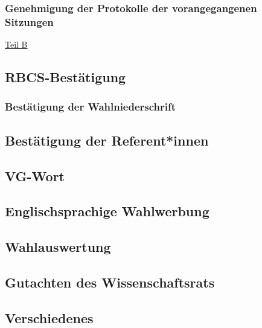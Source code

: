 \documentclass[ngerman,headheight=70pt]{scrartcl}
\begin{document}
    \subsubsection{Genehmigung der Protokolle der vorangegangenen Sitzungen}


    \vspace{0.5cm}
    {\Large \underline{Teil B}}


    \subsection{RBCS-Bestätigung}

    \subsubsection{Bestätigung der Wahlniederschrift}

    \subsection{Bestätigung der Referent*innen}

    \subsection{VG-Wort}

    \subsection{Englischsprachige Wahlwerbung}

    \subsection{Wahlauswertung}

    \subsection{Gutachten des Wissenschaftsrats}

    \subsection{Verschiedenes}
\end{document}
